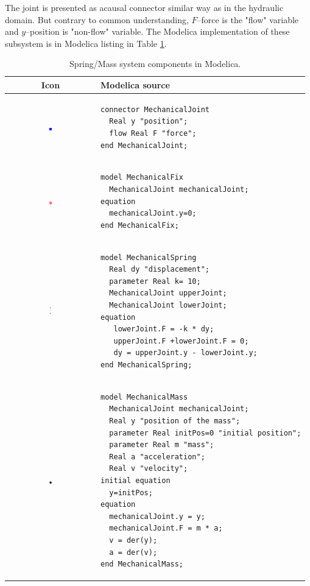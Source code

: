 \documentclass[letterpaper, 10 pt, conference]{ieeeconf}  %
\begin{document}
The joint is presented as acausal connector similar way as in the hydraulic domain. But contrary to common understanding, $F$--force is the "flow" variable and $y$--position is "non-flow" variable. The Modelica implementation of these subsystem is in Modelica listing in Table \ref{spring}.
\begin{table}
\begin{tabular}{cl}
Icon & Modelica source \\
\hline
\includegraphics[width=0.03\textwidth]{joint.png} & 
\begin{lstlisting}[language=modelica, backgroundcolor=\color{white}]
connector MechanicalJoint
  Real y "position";
  flow Real F "force";
end MechanicalJoint;
\end{lstlisting} \\
\hline
\includegraphics[width=0.03\textwidth]{fix.png} & 
\begin{lstlisting}[language=modelica, backgroundcolor=\color{white}]
model MechanicalFix
  MechanicalJoint mechanicalJoint;
equation 
  mechanicalJoint.y=0;
end MechanicalFix;
\end{lstlisting}\\
\hline
\includegraphics[width=0.03\textwidth]{spring.png} & 
\begin{lstlisting}[language=modelica, backgroundcolor=\color{white}]
model MechanicalSpring
  Real dy "displacement";
  parameter Real k= 10;
  MechanicalJoint upperJoint;
  MechanicalJoint lowerJoint;
equation 
   lowerJoint.F = -k * dy;
   upperJoint.F +lowerJoint.F = 0;
   dy = upperJoint.y - lowerJoint.y;
end MechanicalSpring;
\end{lstlisting}\\
\hline
\includegraphics[width=0.03\textwidth]{mass.png} & 
\begin{lstlisting}[language=modelica, backgroundcolor=\color{white}]
model MechanicalMass
  MechanicalJoint mechanicalJoint;
  Real y "position of the mass";
  parameter Real initPos=0 "initial position";
  parameter Real m "mass";
  Real a "acceleration";
  Real v "velocity";
initial equation 
  y=initPos;
equation 
  mechanicalJoint.y = y;
  mechanicalJoint.F = m * a;
  v = der(y);
  a = der(v);
end MechanicalMass; 
\end{lstlisting}
\end{tabular}
\caption{Spring/Mass system components in Modelica.}
\label{spring}
\end{table}
\end{document}
